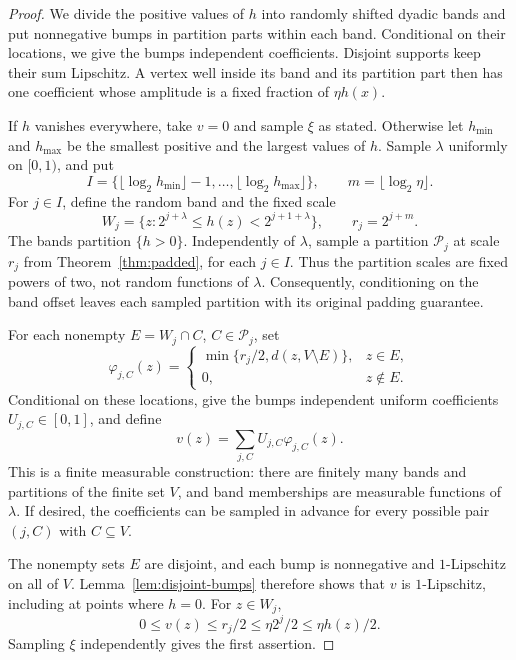 \begin{proof}
We divide the positive values of $h$ into randomly shifted dyadic
bands and put nonnegative bumps in partition parts within each band.
Conditional on their locations, we give the bumps independent
coefficients.  Disjoint supports keep their sum Lipschitz.  A vertex well
inside its band and its partition part then has one coefficient whose
amplitude is a fixed fraction of $\eta h(x)$.

If $h$ vanishes everywhere, take $v=0$ and sample $\xi$ as stated.
Otherwise let $h_{\min}$ and $h_{\max}$ be the smallest positive and the
largest values of $h$. Sample $\lambda$ uniformly on $[0,1)$, and put
\[
  I=\{\lfloor\log_2h_{\min}\rfloor-1,\ldots,
            \lfloor\log_2h_{\max}\rfloor\},
  \qquad m=\lfloor\log_2\eta\rfloor.
\]
For $j\in I$, define the random band and the fixed scale
\[
  W_j=\{z:2^{j+\lambda}\leq h(z)<2^{j+1+\lambda}\},
  \qquad r_j=2^{j+m}.
\]
The bands partition $\{h>0\}$. Independently of $\lambda$, sample a
partition $\mathcal P_j$ at scale $r_j$ from
Theorem~\ref{thm:padded}, for each $j\in I$. Thus the partition scales
are fixed powers of two, not random functions of $\lambda$.
Consequently, conditioning on the band offset leaves each sampled
partition with its original padding guarantee.

For each nonempty $E=W_j\cap C$, $C\in\mathcal P_j$, set
\[
  \varphi_{j,C}(z)=
  \begin{cases}
    \min\{r_j/2,d(z,V\setminus E)\},&z\in E,\\
    0,&z\notin E.
  \end{cases}
\]
Conditional on these locations, give the bumps independent uniform
coefficients $U_{j,C}\in[0,1]$, and define
\[
  v(z)=\sum_{j,C}U_{j,C}\varphi_{j,C}(z).
\]
This is a finite measurable construction: there are finitely many bands
and partitions of the finite set $V$, and band memberships are measurable
functions of $\lambda$. If desired, the coefficients can be sampled in
advance for every possible pair $(j,C)$ with $C\subseteq V$.

The nonempty sets $E$ are disjoint, and each bump is nonnegative and
$1$-Lipschitz on all of $V$. Lemma~\ref{lem:disjoint-bumps} therefore
shows that $v$ is $1$-Lipschitz, including at points where $h=0$. For $z\in W_j$,
\[
  0\leq v(z)\leq r_j/2
       \leq\eta 2^j/2\leq\eta h(z)/2.
\]
Sampling $\xi$ independently gives the first assertion.


\end{proof}
